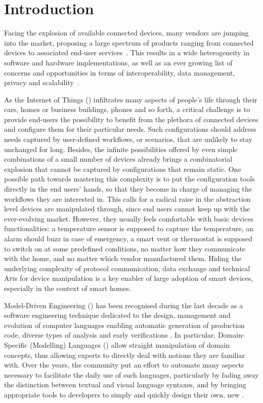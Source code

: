 \section{Introduction}
\label{sec:Introduction}

Facing the explosion of available connected devices, many vendors are jumping into the market, proposing a large spectrum of products ranging from connected devices to associated end-user services~\cite{lee-15}. This results in a wide heterogeneity in software and hardware implementations, as well as an ever growing list of concerns and opportunities in terms of interoperability, data management, privacy and scalability~\cite{chaqfeh-12}.

As the Internet of Things (\IOT) infiltrates many aspects of people's life through their cars, homes or business buildings, phones and so forth, a critical challenge is to provide end-users the possibility to benefit from the plethora of connected devices and configure them for their particular needs. Such configurations should address needs captured by user-defined workflows, or scenarios, that are unlikely to stay unchanged for long. Besides, the infinite possibilities offered by even simple combinations of a small number of devices already brings a combinatorial explosion that cannot be captured by configurations that remain static. One possible path towards mastering this complexity is to put the configuration tools directly in the end users' hands, so that they become in charge of managing the workflows they are interested in. This calls for a radical raise in the abstraction level devices are manipulated through, since end users cannot keep up with the ever-evolving \IOT market. However, they usually feels comfortable with basic devices functionalities: a temperature sensor is supposed to capture the temperature, an alarm should buzz in case of emergency, a smart vent or thermostat is supposed to switch on at some predefined conditions, no matter how they communicate with the home, and no matter which vendor manufactured them. Hiding the underlying complexity of protocol communication, data exchange and technical \textsc{Api}s for device manipulation is a key enabler of large adoption of smart devices, especially in the context of smart homes.

Model-Driven Engineering (\MDE) has been recognised during the last decade as a software engineering technique dedicated to the design, management and evolution of computer languages enabling automatic generation of production code, diverse types of analysis and early verifications \cite{J:Lucio-Amrani-etAl:2014}. In particular, Domain-Specific (Modelling) Languages (\DSLS) allow straight manipulation of domain concepts, thus allowing experts to directly deal with notions they are familiar with. Over the years, the \MDE community put an effort to automate many aspects necessary to facilitate the daily use of such languages, particularly by fading away the distinction between textual and visual language syntaxes, and by bringing appropriate tools to developers to simply and quickly design their own, new \DSLS.

